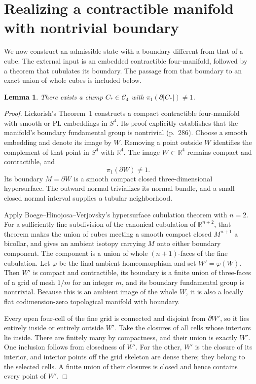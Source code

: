 \documentclass[11pt]{article}
\newtheorem{lemma}[theorem]{Lemma}
\theoremstyle{remark}
\newcommand{\Cl}{\mathcal C}
\newcommand{\R}{\mathbb R}
\newcommand{\bd}{\partial}
\begin{document}
\section{Realizing a contractible manifold with nontrivial boundary}

We now construct an admissible state with a boundary different from that of
a cube. The external input is an embedded contractible four-manifold,
followed by a theorem that cubulates its boundary. The passage from that
boundary to an exact union of whole cubes is included below.

\begin{lemma}\label{lem:realization}
There exists a clump $C_*\in\Cl_4$ with
$\pi_1(\bd|C_*|)\neq1$.
\end{lemma}

\begin{proof}
Lickorish's Theorem~1 \cite[pp.~284--286]{Lickorish} constructs a compact
contractible four-manifold with smooth or PL embeddings in $S^4$. Its
proof explicitly establishes that the manifold's boundary fundamental
group is nontrivial (p.~286). Choose a smooth embedding and denote its
image by $W$. Removing a point outside $W$ identifies the complement of
that point in $S^4$ with $\R^4$. The image $W\subset\R^4$ remains
compact and contractible, and
\[
 \pi_1(\bd W)\neq1.
\]
Its boundary $M=\bd W$ is a smooth compact closed three-dimensional
hypersurface. The outward normal trivializes its normal bundle, and a
small closed normal interval supplies a tubular neighborhood.

Apply Boege--Hinojosa--Verjovsky's hypersurface cubulation theorem
\cite[Theorem~2.8 in the author preprint, version~2]{BHV} with $n=2$.
For a sufficiently fine subdivision of the canonical cubulation of
$\R^{n+2}$, that theorem makes the union of cubes meeting a smooth
compact closed $M^{n+1}$ a bicollar, and gives an ambient isotopy carrying
$M$ onto either boundary component. The component is a union of whole
$(n+1)$-faces of the fine cubulation. Let $\varphi$ be the final ambient
homeomorphism and set $W'=\varphi(W)$. Then $W'$ is compact and
contractible, its boundary is a finite union of three-faces of a grid of
mesh $1/m$ for an integer $m$, and its boundary fundamental group is
nontrivial. Because this is an ambient image of the whole $W$, it is
also a locally flat codimension-zero topological manifold with boundary.

Every open four-cell of the fine grid is connected and disjoint from
$\bd W'$, so it lies entirely inside or entirely outside $W'$. Take
the closures of all cells whose interiors lie inside. There are finitely
many by compactness, and their union is exactly $W'$. One inclusion
follows from closedness of $W'$. For the other, $W'$ is the closure of
its interior, and interior points off the grid skeleton are dense there;
they belong to the selected cells. A finite union of their closures is
closed and hence contains every point of $W'$.


\end{proof}
\end{document}
